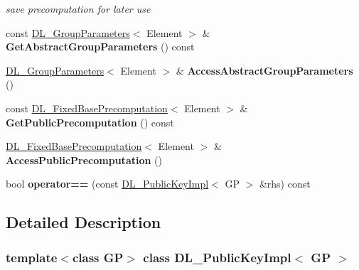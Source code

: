 \begin{DoxyCompactItemize}
\begin{DoxyCompactList}\small\item\em save precomputation for later use \item\end{DoxyCompactList}\item 
\hypertarget{class_d_l___public_key_impl_a79c77bb35d921450a7097a66fa53d0fa}{
const \hyperlink{class_d_l___group_parameters}{DL\_\-GroupParameters}$<$ Element $>$ \& {\bfseries GetAbstractGroupParameters} () const }
\label{class_d_l___public_key_impl_a79c77bb35d921450a7097a66fa53d0fa}

\item 
\hypertarget{class_d_l___public_key_impl_a2ff2c005ee4b85eb1406799afc28b8a0}{
\hyperlink{class_d_l___group_parameters}{DL\_\-GroupParameters}$<$ Element $>$ \& {\bfseries AccessAbstractGroupParameters} ()}
\label{class_d_l___public_key_impl_a2ff2c005ee4b85eb1406799afc28b8a0}

\item 
\hypertarget{class_d_l___public_key_impl_aa232e1e970f94d215d8d198ae4f26f2a}{
const \hyperlink{class_d_l___fixed_base_precomputation}{DL\_\-FixedBasePrecomputation}$<$ Element $>$ \& {\bfseries GetPublicPrecomputation} () const }
\label{class_d_l___public_key_impl_aa232e1e970f94d215d8d198ae4f26f2a}

\item 
\hypertarget{class_d_l___public_key_impl_a43c88026bb625ad49dea861f807eb9c3}{
\hyperlink{class_d_l___fixed_base_precomputation}{DL\_\-FixedBasePrecomputation}$<$ Element $>$ \& {\bfseries AccessPublicPrecomputation} ()}
\label{class_d_l___public_key_impl_a43c88026bb625ad49dea861f807eb9c3}

\item 
\hypertarget{class_d_l___public_key_impl_ad85bac7968951f69145a28196d859062}{
bool {\bfseries operator==} (const \hyperlink{class_d_l___public_key_impl}{DL\_\-PublicKeyImpl}$<$ GP $>$ \&rhs) const }
\label{class_d_l___public_key_impl_ad85bac7968951f69145a28196d859062}

\end{DoxyCompactItemize}


\subsection{Detailed Description}
\subsubsection*{template$<$class GP$>$ class DL\_\-PublicKeyImpl$<$ GP $>$}

